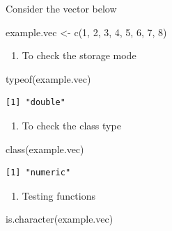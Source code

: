 \documentclass[
  letterpaper,
  DIV=11,
  numbers=noendperiod]{scrreprt}
\newenvironment{Shaded}{\begin{snugshade}}{\end{snugshade}}
\newcommand{\DecValTok}[1]{\textcolor[rgb]{0.68,0.00,0.00}{#1}}
\newcommand{\FunctionTok}[1]{\textcolor[rgb]{0.28,0.35,0.67}{#1}}
\newcommand{\NormalTok}[1]{\textcolor[rgb]{0.00,0.23,0.31}{#1}}
\newcommand{\OtherTok}[1]{\textcolor[rgb]{0.00,0.23,0.31}{#1}}
\providecommand{\tightlist}{%
  \setlength{\itemsep}{0pt}\setlength{\parskip}{0pt}}\usepackage{longtable,booktabs,array}
\begin{document}
Consider the vector below

\begin{Shaded}
\begin{Highlighting}[]
\NormalTok{example.vec }\OtherTok{\textless{}{-}} \FunctionTok{c}\NormalTok{(}\DecValTok{1}\NormalTok{,  }\DecValTok{2}\NormalTok{,  }\DecValTok{3}\NormalTok{, }\DecValTok{4}\NormalTok{, }\DecValTok{5}\NormalTok{, }\DecValTok{6}\NormalTok{, }\DecValTok{7}\NormalTok{, }\DecValTok{8}\NormalTok{)}
\end{Highlighting}
\end{Shaded}

\begin{enumerate}
\def\labelenumi{\arabic{enumi}.}
\tightlist
\item
  To check the storage mode
\end{enumerate}

\begin{Shaded}
\begin{Highlighting}[]
\FunctionTok{typeof}\NormalTok{(example.vec)}
\end{Highlighting}
\end{Shaded}

\begin{verbatim}
[1] "double"
\end{verbatim}

\begin{enumerate}
\def\labelenumi{\arabic{enumi}.}
\setcounter{enumi}{1}
\tightlist
\item
  To check the class type
\end{enumerate}

\begin{Shaded}
\begin{Highlighting}[]
\FunctionTok{class}\NormalTok{(example.vec)}
\end{Highlighting}
\end{Shaded}

\begin{verbatim}
[1] "numeric"
\end{verbatim}

\begin{enumerate}
\def\labelenumi{\arabic{enumi}.}
\setcounter{enumi}{2}
\tightlist
\item
  Testing functions
\end{enumerate}

\begin{Shaded}
\begin{Highlighting}[]
\FunctionTok{is.character}\NormalTok{(example.vec)}
\end{Highlighting}
\end{Shaded}
\end{document}

